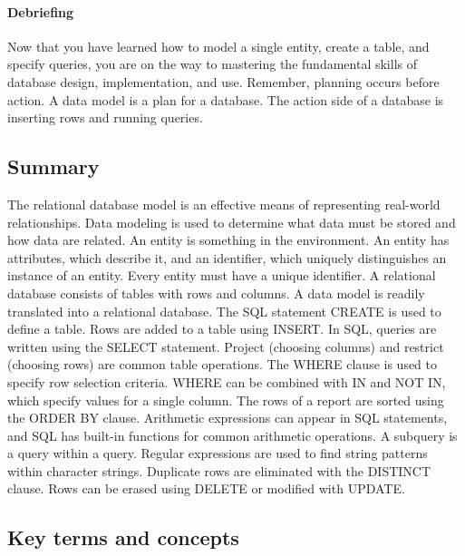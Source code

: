 \documentclass[
]{article}
\begin{document}
\hypertarget{debriefing}{%
\paragraph*{Debriefing}\label{debriefing}}

Now that you have learned how to model a single entity, create a table, and specify queries, you are on the way to mastering the fundamental skills of database design, implementation, and use. Remember, planning occurs before action. A data model is a plan for a database. The action side of a database is inserting rows and running queries.

\hypertarget{summary-2}{%
\subsection*{Summary}\label{summary-2}}

The relational database model is an effective means of representing real-world relationships. Data modeling is used to determine what data must be stored and how data are related. An entity is something in the environment. An entity has attributes, which describe it, and an identifier, which uniquely distinguishes an instance of an entity. Every entity must have a unique identifier. A relational database consists of tables with rows and columns. A data model is readily translated into a relational database. The SQL statement CREATE is used to define a table. Rows are added to a table using INSERT. In SQL, queries are written using the SELECT statement. Project (choosing columns) and restrict (choosing rows) are common table operations. The WHERE clause is used to specify row selection criteria. WHERE can be combined with IN and NOT IN, which specify values for a single column. The rows of a report are sorted using the ORDER BY clause. Arithmetic expressions can appear in SQL statements, and SQL has built-in functions for common arithmetic operations. A subquery is a query within a query. Regular expressions are used to find string patterns within character strings. Duplicate rows are eliminated with the DISTINCT clause. Rows can be erased using DELETE or modified with UPDATE.

\hypertarget{key-terms-and-concepts}{%
\subsection*{Key terms and concepts}\label{key-terms-and-concepts}}
\end{document}
